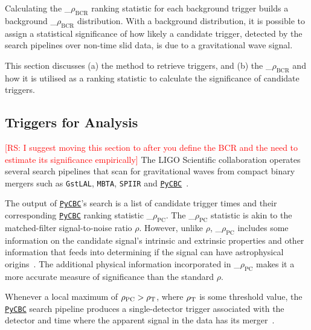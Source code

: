 \documentclass[%
 nofootinbib,
 amsmath,amssymb,
 aps,
 twocolumn
]{revtex4-2}
\newcommand{\pycbc}{{\sc \href{https://pycbc.org/}{\texttt{PyCBC}}}\xspace}
\newcommand{\mathcmd}[1]{{\sc \relax\ifmmode#1\else $#1$\fi}\xspace}
\newcommand{\bcr}{\mathcmd{\rho_\text{BCR}}}
\newcommand{\pycbcstat}{\mathcmd{\rho_\text{PC}}}
\newcommand{\snr}{\mathcmd{\rho}}
\newcommand{\rs}[1]{\textcolor{red}{[RS: #1]}}
\begin{document}

Calculating the \bcr ranking statistic for each background trigger builds a background \bcr distribution. With a background distribution,  it is possible to assign a statistical significance of how likely a candidate trigger, detected by the search pipelines over non-time slid data, is due to a gravitational wave signal. 

This section discusses (a) the method to retrieve triggers, and (b) the \bcr and how it is utilised as a ranking statistic to calculate the significance of candidate triggers.


\subsection{Triggers for Analysis}
\rs{I suggest moving this section to after you define the BCR and the need to estimate its significance empirically}
The LIGO Scientific collaboration operates several search pipelines that scan for gravitational waves from compact binary mergers such as \texttt{GstLAL}, \texttt{MBTA}, \texttt{SPIIR} and \pycbc~\cite{GWTC1}.

The output of \pycbc's search is a list of candidate trigger times and their corresponding \pycbc ranking statistic \pycbcstat. The \pycbcstat statistic is akin to the matched-filter signal-to-noise ratio \snr. However, unlike \snr, \pycbcstat includes some information on the candidate signal's intrinsic and extrinsic properties and other information that feeds into determining if the signal can have astrophysical origins~\cite{pycbc_og6}. The additional physical information incorporated in \pycbcstat makes it a more accurate measure of significance than the standard \snr. 

Whenever a local maximum of $\pycbcstat > \snr_\text{T}$, where $\snr_\text{T}$ is some threshold value, the \pycbc search pipeline produces a single-detector trigger associated with the detector and time where the apparent signal in the data has its merger~\cite{pycbc_og6}.
\end{document}
